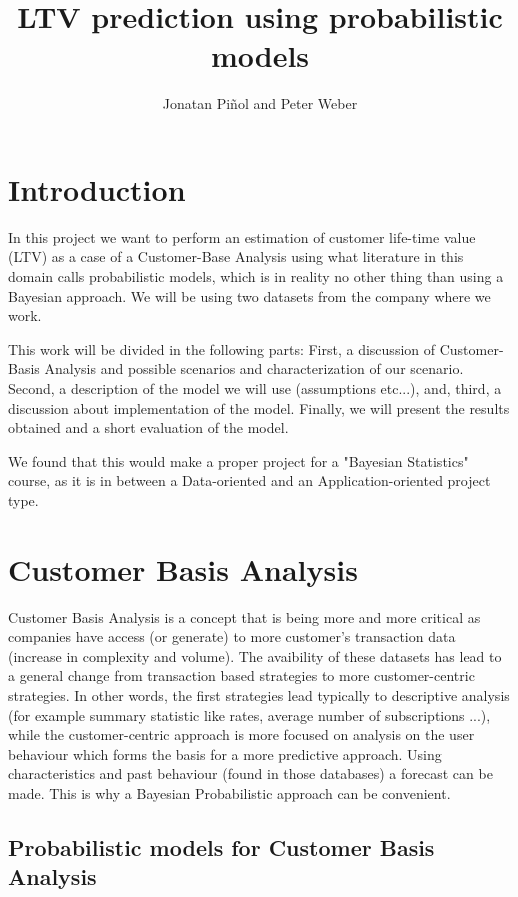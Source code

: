 \documentclass[paper=a4, fontsize=11pt]{scrartcl} %
\title{LTV prediction using probabilistic models}
\author{Jonatan Pi\~nol and Peter Weber}
\date{} %
\numberwithin{equation}{section} %
\numberwithin{figure}{section} %
\numberwithin{table}{section} %
\begin{document}
	
	\maketitle
	\tableofcontents
	
	\newpage
	\section{Introduction}
	
	In this project we want to perform an estimation of customer life-time value (LTV) as a case of a Customer-Base Analysis using what literature in this domain calls probabilistic models, which is in reality no other thing than using a Bayesian approach. We will be using two datasets from the company where we work.
	
	This work will be divided in the following parts: First, a discussion of Customer-Basis Analysis and possible scenarios and characterization of our scenario. Second, a description of the model we will use (assumptions etc...), and, third, a discussion about implementation of the model. Finally, we will present the results obtained and a short evaluation of the model.
	
	We found that this would make a proper project for a "Bayesian Statistics" course, as it is in between a Data-oriented and an Application-oriented project type.
	
	\section{Customer Basis Analysis}
	
	Customer Basis Analysis is a concept that is being more and more critical as companies have access (or generate) to more customer's transaction data (increase in complexity and volume). The avaibility of these datasets has lead to a general change from transaction based strategies to more customer-centric strategies. In other words, the first strategies lead typically to descriptive analysis (for example summary statistic like rates, average number of subscriptions ...), while the customer-centric approach is more focused on analysis on the user behaviour which forms the basis for a more predictive approach. Using characteristics and past behaviour (found in those databases) a forecast can be made. This is why a Bayesian Probabilistic approach can be convenient.
	
	\subsection{Probabilistic models for Customer Basis Analysis}
	
\end{document}
